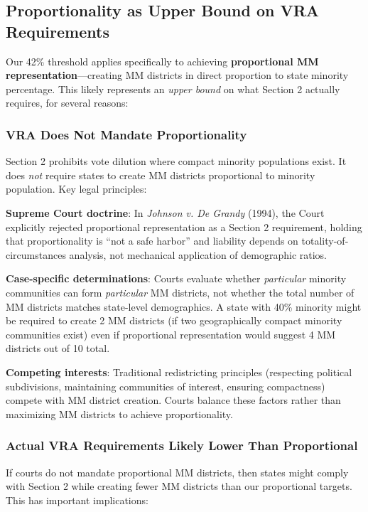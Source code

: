 \subsection{Proportionality as Upper Bound on VRA Requirements}

Our 42\% threshold applies specifically to achieving \textbf{proportional MM representation}---creating MM districts in direct proportion to state minority percentage. This likely represents an \textit{upper bound} on what Section 2 actually requires, for several reasons:

\subsubsection{VRA Does Not Mandate Proportionality}

Section 2 prohibits vote dilution where compact minority populations exist. It does \emph{not} require states to create MM districts proportional to minority population. Key legal principles:

\textbf{Supreme Court doctrine}: In \textit{Johnson v. De Grandy} (1994), the Court explicitly rejected proportional representation as a Section 2 requirement, holding that proportionality is ``not a safe harbor'' and liability depends on totality-of-circumstances analysis, not mechanical application of demographic ratios.

\textbf{Case-specific determinations}: Courts evaluate whether \emph{particular} minority communities can form \emph{particular} MM districts, not whether the total number of MM districts matches state-level demographics. A state with 40\% minority might be required to create 2 MM districts (if two geographically compact minority communities exist) even if proportional representation would suggest 4 MM districts out of 10 total.

\textbf{Competing interests}: Traditional redistricting principles (respecting political subdivisions, maintaining communities of interest, ensuring compactness) compete with MM district creation. Courts balance these factors rather than maximizing MM districts to achieve proportionality.

\subsubsection{Actual VRA Requirements Likely Lower Than Proportional}

If courts do not mandate proportional MM districts, then states might comply with Section 2 while creating fewer MM districts than our proportional targets. This has important implications:

